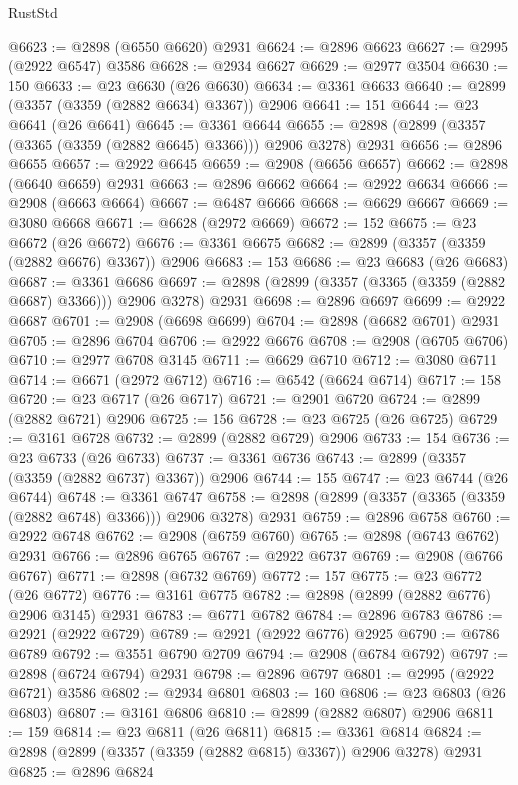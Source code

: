 \begin{lexlean}{RustStd}
\begin{coremodule}
@6623 := @2898 (@6550 @6620) @2931
@6624 := @2896 @6623
@6627 := @2995 (@2922 @6547) @3586
@6628 := @2934 @6627
@6629 := @2977 @3504
@6630 := 150
@6633 := @23 @6630 (@26 @6630)
@6634 := @3361 @6633
@6640 := @2899 (@3357 (@3359 (@2882 @6634) @3367)) @2906
@6641 := 151
@6644 := @23 @6641 (@26 @6641)
@6645 := @3361 @6644
@6655 := @2898 (@2899 (@3357 (@3365 (@3359 (@2882 @6645) @3366))) @2906 @3278) @2931
@6656 := @2896 @6655
@6657 := @2922 @6645
@6659 := @2908 (@6656 @6657)
@6662 := @2898 (@6640 @6659) @2931
@6663 := @2896 @6662
@6664 := @2922 @6634
@6666 := @2908 (@6663 @6664)
@6667 := @6487 @6666
@6668 := @6629 @6667
@6669 := @3080 @6668
@6671 := @6628 (@2972 @6669)
@6672 := 152
@6675 := @23 @6672 (@26 @6672)
@6676 := @3361 @6675
@6682 := @2899 (@3357 (@3359 (@2882 @6676) @3367)) @2906
@6683 := 153
@6686 := @23 @6683 (@26 @6683)
@6687 := @3361 @6686
@6697 := @2898 (@2899 (@3357 (@3365 (@3359 (@2882 @6687) @3366))) @2906 @3278) @2931
@6698 := @2896 @6697
@6699 := @2922 @6687
@6701 := @2908 (@6698 @6699)
@6704 := @2898 (@6682 @6701) @2931
@6705 := @2896 @6704
@6706 := @2922 @6676
@6708 := @2908 (@6705 @6706)
@6710 := @2977 @6708 @3145
@6711 := @6629 @6710
@6712 := @3080 @6711
@6714 := @6671 (@2972 @6712)
@6716 := @6542 (@6624 @6714)
@6717 := 158
@6720 := @23 @6717 (@26 @6717)
@6721 := @2901 @6720
@6724 := @2899 (@2882 @6721) @2906
@6725 := 156
@6728 := @23 @6725 (@26 @6725)
@6729 := @3161 @6728
@6732 := @2899 (@2882 @6729) @2906
@6733 := 154
@6736 := @23 @6733 (@26 @6733)
@6737 := @3361 @6736
@6743 := @2899 (@3357 (@3359 (@2882 @6737) @3367)) @2906
@6744 := 155
@6747 := @23 @6744 (@26 @6744)
@6748 := @3361 @6747
@6758 := @2898 (@2899 (@3357 (@3365 (@3359 (@2882 @6748) @3366))) @2906 @3278) @2931
@6759 := @2896 @6758
@6760 := @2922 @6748
@6762 := @2908 (@6759 @6760)
@6765 := @2898 (@6743 @6762) @2931
@6766 := @2896 @6765
@6767 := @2922 @6737
@6769 := @2908 (@6766 @6767)
@6771 := @2898 (@6732 @6769)
@6772 := 157
@6775 := @23 @6772 (@26 @6772)
@6776 := @3161 @6775
@6782 := @2898 (@2899 (@2882 @6776) @2906 @3145) @2931
@6783 := @6771 @6782
@6784 := @2896 @6783
@6786 := @2921 (@2922 @6729)
@6789 := @2921 (@2922 @6776) @2925
@6790 := @6786 @6789
@6792 := @3551 @6790 @2709
@6794 := @2908 (@6784 @6792)
@6797 := @2898 (@6724 @6794) @2931
@6798 := @2896 @6797
@6801 := @2995 (@2922 @6721) @3586
@6802 := @2934 @6801
@6803 := 160
@6806 := @23 @6803 (@26 @6803)
@6807 := @3161 @6806
@6810 := @2899 (@2882 @6807) @2906
@6811 := 159
@6814 := @23 @6811 (@26 @6811)
@6815 := @3361 @6814
@6824 := @2898 (@2899 (@3357 (@3359 (@2882 @6815) @3367)) @2906 @3278) @2931
@6825 := @2896 @6824

\end{coremodule}
\end{lexlean}
